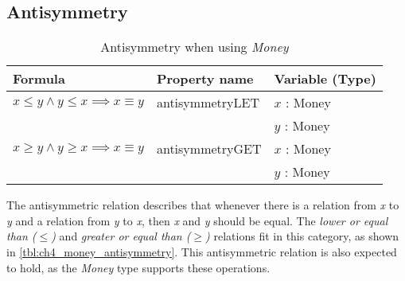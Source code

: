 \subsection*{Antisymmetry}
\label{ssct:properties_antisymmetry}
\begin{table}[!ht]
\centering
\begin{tabular}{lll}
\hline
                        \textbf{Formula}                              & \textbf{Property name} & \textbf{Variable (Type)} \\ \hline
\rowcolor[HTML]{EFEFEF} $x \leq y \land y \leq x \implies x \equiv y$ & antisymmetryLET        & $x$ : Money              \\
\rowcolor[HTML]{EFEFEF}                                               &                        & $y$ : Money              \\
                        $x \geq y \land y \geq x \implies x \equiv y$ & antisymmetryGET        & $x$ : Money              \\
                                                                      &                        & $y$ : Money              \\ \hline
\end{tabular}
\caption{Antisymmetry when using \textit{Money}}
\label{tbl:ch4_money_antisymmetry}
\end{table}
\FloatBarrier\noindent
The antisymmetric relation describes that whenever there is a relation from
\textit{x} to \textit{y} and a relation from \textit{y} to \textit{x}, then
\textit{x} and \textit{y} should be equal. The
\textit{lower or equal than ($\leq$)} and
\textit{greater or equal than ($\geq$)} relations fit in this category, as shown
in \autoref{tbl:ch4_money_antisymmetry}. This antisymmetric relation is also
expected to hold, as the \textit{Money} type supports these operations.

